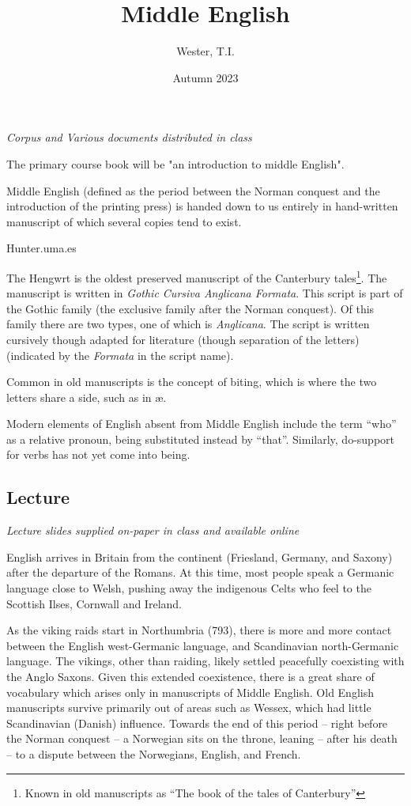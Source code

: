 \documentclass[12pt]{report}
\title{Middle English}
\date{Autumn 2023}
\author{Wester, T.I.}
\begin{document}
\maketitle
\tableofcontents

\chapter{}

\textit{Corpus and Various documents distributed in class}

The primary course book will be "an introduction to middle English".

Middle English (defined as the period between the Norman conquest and the
introduction of the printing press) is handed down to us entirely in
hand-written manuscript of which several copies tend to exist.

Hunter.uma.es

The Hengwrt is the oldest preserved manuscript of the Canterbury
tales\footnote{Known in old manuscripts as ``The book of the tales of
Canterbury''}. The manuscript is written in \textit{Gothic Cursiva Anglicana
Formata}. This script is part of the Gothic family (the exclusive family after
the Norman conquest).  Of this family there are two types, one of which is
\textit{Anglicana}.  The script is written cursively though adapted for
literature (though separation of the letters) (indicated by the \textit{Formata}
in the script name).

Common in old manuscripts is the concept of biting, which is where the two
letters share a side, such as in \ae.

Modern elements of English absent from Middle English include the term ``who''
as a relative pronoun, being substituted instead by ``that''. Similarly,
do-support for verbs has not yet come into being.

\section{Lecture}

\textit{Lecture slides supplied on-paper in class and available online}

English arrives in Britain from the continent (Friesland, Germany, and Saxony)
after the departure of the Romans. At this time, most people speak a Germanic
language close to Welsh, pushing away the indigenous Celts who feel to the
Scottish Ilses, Cornwall and Ireland.

As the viking raids start in Northumbria (793), there is more and more contact
between the English west-Germanic language, and Scandinavian north-Germanic
language. The vikings, other than raiding, likely settled peacefully coexisting
with the Anglo Saxons. Given this extended coexistence, there is a great share
of vocabulary which arises only in manuscripts of Middle English. Old English
manuscripts survive primarily out of areas such as Wessex, which had little
Scandinavian (Danish) influence. Towards the end of this period -- right before
the Norman conquest -- a Norwegian sits on the throne, leaning -- after his
death -- to a dispute between the Norwegians, English, and French.
\end{document}
